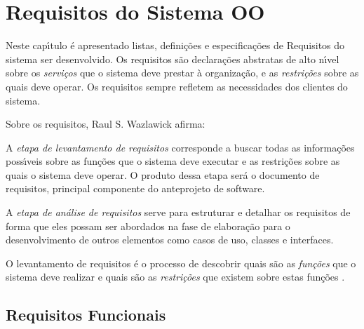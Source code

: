 
\chapter{Requisitos do Sistema OO}


Neste cap\'{\i}tulo \'{e} apresentado listas, defini\c{c}\~{o}es e especifica\c{c}\~{o}es de Requisitos do sistema ser desenvolvido. Os requisitos s\~{a}o declara\c{c}\~{o}es abstratas de alto n\'{\i}vel sobre os \textit{servi\c{c}os} que o sistema deve prestar \`{a} organiza\c{c}\~{a}o, e as \textit{restri\c{c}\~{o}es} sobre as quais deve operar. Os requisitos sempre refletem as necessidades dos clientes do sistema.

Sobre os requisitos,  Raul S. Wazlawick afirma:
\begin{citadireta}
A \textit{etapa de levantamento de requisitos} corresponde a buscar todas as informa\c{c}\~{o}es poss\'{\i}veis sobre as fun\c{c}\~{o}es que o sistema deve executar e as restri\c{c}\~{o}es sobre as quais o sistema deve operar. O produto dessa etapa ser\'{a} o documento de requisitos, principal componente do anteprojeto de software.

A \textit{etapa de an\'{a}lise de requisitos} serve para estruturar e detalhar os requisitos de forma que eles possam ser abordados na fase de elabora\c{c}\~{a}o para o desenvolvimento  de outros elementos como casos de uso, classes e interfaces.

O levantamento de requisitos \'{e} o processo de descobrir quais s\~{a}o as \textit{fun\c{c}\~{o}es} que o sistema deve realizar e quais s\~{a}o as \textit{restri\c{c}\~{o}es} que existem sobre estas fun\c{c}\~{o}es  \cite{Wazlawick2011}.
\end{citadireta}



     \section{ Requisitos Funcionais}

